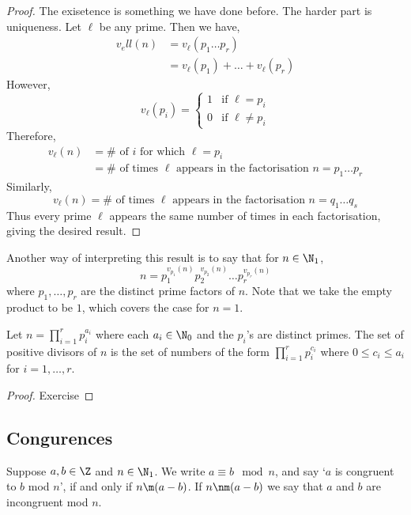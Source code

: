 \begin{proof}
  The exisetence is something we have done before. The harder part is uniqueness. Let $\ell$ be any prime. Then we have,
  \begin{align*}
    v_ell (n) &= v_\ell (p_1\dots p_r)\\
    &= v_\ell (p_1) + \dots + v_\ell (p_r)
  \end{align*}
  However,
  $$ v_{\ell} (p_i) = \begin{cases}
    1 & \text{if $\ell = p_i$}\\
    0 & \text{if $\ell \ne p_i$}
  \end{cases} $$
  Therefore,
  \begin{align*}
    v_\ell (n) &= \# \text{ of $i$ for which $\ell = p_i$}\\
    &= \# \text{ of times $\ell$ appears in the factorisation $n = p_1\dots p_r$}
  \end{align*}
  Similarly,
  $$ v_\ell (n) = \# \text{ of times $\ell$ appears in the factorisation $n = q_1\dots q_s$} $$
  Thus every prime $\ell$ appears the same number of times in each factorisation, giving the desired result.
\end{proof}


\begin{remark}
  Another way of interpreting this result is to say that for $n \in \N_1$,
  $$ n = p_1^{v_{p_1}(n)}p_2^{v_{p_2}(n)}\dots p_r^{v_{p_r}(n)} $$
  where $p_1, \dots, p_r$ are the distinct prime factors of $n$. Note that we take the empty product to be $1$, which covers the case for $n = 1$.
\end{remark}

\begin{nlemma}
  Let $n = \prod_{i=1}^r p_i^{a_i}$ where each $a_i \in \N_0$ and the $p_i$'s are distinct primes. The set of positive divisors of $n$ is the set of numbers of the form $\prod_{i=1}^r p_i^{c_i}$ where $0 \le c_i \le a_i$ for $i = 1, \dots, r$.
\end{nlemma}
\begin{proof}
  Exercise
\end{proof}

\subsection{Congurences}


\begin{ndefi}[]
  Suppose $a, b \in \Z$ and $n \in \N_1$. We write $a \equiv b \mod n$, and say `$a$ is congruent to $b$ mod $n$', if and only if $n \m (a - b)$. If $n \nm (a - b)$ we say that $a$ and $b$ are incongruent mod $n$.
\end{ndefi}

